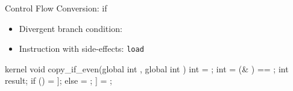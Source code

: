 \begin{frame}[fragile]{Control Flow Conversion: if}

\begin{minipage}[t]{0.50\linewidth}

\begin{itemize}
    \item Divergent branch condition: 
    \item Instruction with side-effects: \texttt{load}
\end{itemize}

\begin{codebox}[commandchars=\\\[\]]
kernel void copy_if_even(global int \uniform[*src],
                         global int \uniform[*dst]) {
  int \varying[tid] = ;
  int \varying[cond] = (\varying[tid] & \uniform[1]) == \uniform[0];
  int result;
  if (\varying[cond]) {
    \varying[result] = \uniform[src]\idx[\varying[tid]];
  } else {
    \uniform[result] = \uniform[-1];
  }
  \uniform[dst]\idx[\varying[tid]] = \varying[result];
}
\end{codebox}

\end{minipage}
\hspace{1em}
\begin{minipage}[t]{0.43\linewidth}

\vspace{0.1ex}

\end{minipage}

\end{frame}


